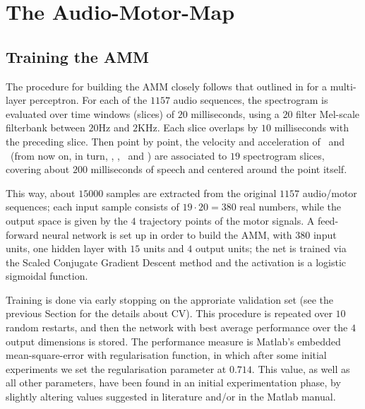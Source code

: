 \section{The Audio-Motor-Map}
\label{sec:rec}

\subsection{Training the AMM}
\label{subsec:amm_setup}

The procedure for building the AMM closely follows that outlined in
\cite{papcun,richmond2002,richmond2007} for a multi-layer perceptron.
For each of the $1157$ audio sequences, the spectrogram is evaluated
over time windows (slices) of $20$ milliseconds, using a $20$ filter
Mel-scale filterbank between $20$Hz and $2$KHz.
Each slice overlaps by $10$ milliseconds with
the preceding slice. Then point by point, the velocity and acceleration of
\lio\ and \ttu\ (from now on, in turn, \vlio, \alio, \vttu\ and \attu) are
associated to $19$ spectrogram slices, covering about $200$ milliseconds
of speech and centered around the point itself.

This way, about $15000$ samples are extracted from the original $1157$
audio/motor sequences; each input sample consists of $19\cdot 20 = 380$ real
numbers, while the output space is given by the $4$ trajectory points of
the motor signals. A feed-forward neural network is set up in order to
build the AMM, with $380$ input units, one hidden layer with $15$ units and
$4$ output units; the net is trained via the Scaled Conjugate Gradient
Descent method \cite{MOLLER93} and the activation is a logistic sigmoidal function.

Training is done via early stopping on the approriate validation set (see the previous
Section for the details about CV). This procedure is repeated over $10$ random restarts, and then
the network with best average performance over the $4$ output dimensions is stored.
The performance measure is Matlab's embedded mean-square-error with regularisation
function, in which after some initial experiments we set the regularisation
parameter at $0.714$. This value, as well as all other parameters, have been found in
an initial experimentation phase, by slightly altering values suggested in literature
and/or in the Matlab manual.

